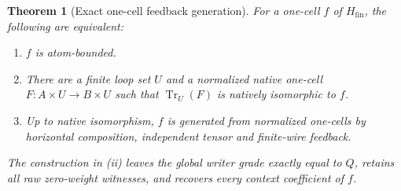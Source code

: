 \documentclass[11pt]{article}
\newtheorem{theorem}{Theorem}
\newcommand{\HM}{H_{\mathrm{fin}}}
\begin{document}
\begin{theorem}[Exact one-cell feedback generation]\label{thm:generation}
For a one-cell $f$ of $\HM$, the following are equivalent:
\begin{enumerate}
\item $f$ is atom-bounded.
\item There are a finite loop set $U$ and a normalized native one-cell $F:A\times U\to B\times U$ such that $\operatorname{Tr}_U(F)$ is natively isomorphic to $f$.
\item Up to native isomorphism, $f$ is generated from normalized one-cells by horizontal composition, independent tensor and finite-wire feedback.
\end{enumerate}
The construction in (ii) leaves the global writer grade exactly equal to $Q$, retains all raw zero-weight witnesses, and recovers every context coefficient of $f$.
\end{theorem}
\end{document}
